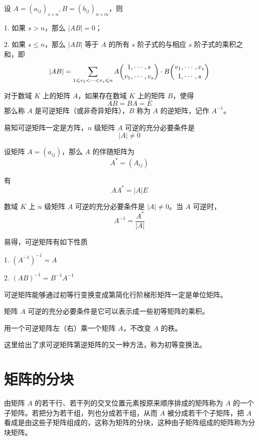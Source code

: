 \begin{theorem}
    设 $A = (a_{ij})_{s\times n},B = (b_{ij})_{n\times m}$，则

    1. 如果 $s>n$，那么 $|AB| = 0$；

    2. 如果 $s\leqslant n$，那么  $|AB|$ 等于 $A$ 的所有 $s$ 阶子式的与相应 $s$ 阶子式的乘积之和，即
    \[|AB|=\sum_{1\leqslant v_1<\cdots< v_s\leqslant n}A \dbinom{1,\cdots,s}{v_1,\cdots,v_s} \cdot B \dbinom{v_1,\cdots,v_s}{1,\cdots,s}\]
\end{theorem}

\begin{definition}
    对于数域 $K$ 上的矩阵 $A$，如果存在数域 $K$ 上的矩阵 $B$，使得
    \[AB = BA = E\]
    那么称 $A$ 是可逆矩阵（或非奇异矩阵），$B$ 称为 $A$ 的逆矩阵，记作 $A^{-1}$。
\end{definition}

易知可逆矩阵一定是方阵，$n$ 级矩阵 $A$ 可逆的充分必要条件是
\[|A| \ne 0\]

\begin{definition}
    设矩阵 $A = (a_{ij})$，那么 $A$ 的伴随矩阵为
    \[A^*=(A_{ij})\]
\end{definition}

有
\[AA^* = |A|E\]

\begin{theorem}
    数域 $K$ 上 $n$ 级矩阵 $A$ 可逆的充分必要条件是 $|A| \ne 0$。当 $A$ 可逆时，
    \[A^{-1} = \frac{A^*}{|A|}\]
\end{theorem}

易得，可逆矩阵有如下性质

1. $(A^{-1})^{-1} = A$

2. $(AB)^{-1} = B^{-1}A^{-1}$

可逆矩阵能够通过初等行变换变成第简化行阶梯形矩阵一定是单位矩阵。

\begin{theorem}
    矩阵 $A$ 可逆的充分必要条件是它可以表示成一些初等矩阵的乘积。
\end{theorem}

用一个可逆矩阵左（右）乘一个矩阵 $A$，不改变 $A$ 的秩。

这里给出了求可逆矩阵第逆矩阵的又一种方法，称为初等变换法。

\section{矩阵的分块}

由矩阵 $A$ 的若干行、若干列的交叉位置元素按原来顺序排成的矩阵称为 $A$ 的一个子矩阵。若把分为若干组，列也分成若干组，从而 $A$ 被分成若干个子矩阵，把 $A$ 看成是由这些子矩阵组成的，这称为矩阵的分块，这种由子矩阵组成的矩阵称为分块矩阵。

